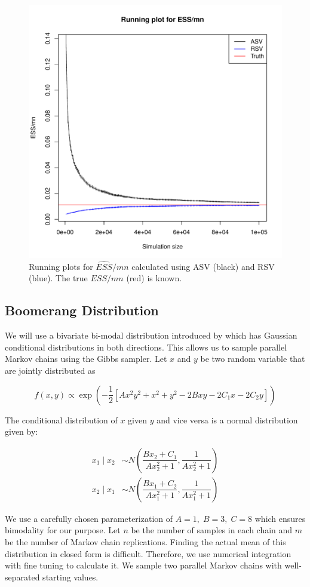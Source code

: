 \documentclass[12pt]{article}
\begin{document}
\begin{figure}[h]
    \centering
    \includegraphics[width = .5\textwidth]{plots/var-ess.pdf}
    \caption{Running plots for $\hat{ESS}/mn$ calculated using ASV (black) and RSV (blue). The true $ESS/mn$ (red) is known.}
    \label{fig:var-ess}
\end{figure}


\subsection{Boomerang Distribution} \label{ex:boomerang}

We will use a bivariate bi-modal distribution introduced by \cite{gelman1991note} which has Gaussian conditional distributions in both directions. This allows us to sample parallel Markov chains using the Gibbs sampler. Let $x$ and $y$ be two random variable that are jointly distributed as 

\[
f(x, y) \propto \exp\left(-\dfrac{1}{2}[Ax^2y^2 + x^2 + y^2 -2Bxy  -2C_1x - 2C_2y]\right)
\]

The conditional distribution of $x$ given $y$ and vice versa is a normal distribution given by:

\begin{align*}
    x_1 \mid x_2 &\sim N\left(\dfrac{Bx_2 + C_1}{Ax_2^2 + 1}, \dfrac{1}{Ax_2^2 + 1}\right)\\
    x_2 \mid x_1 &\sim N\left(\dfrac{Bx_1 + C_2}{Ax_1^2 + 1}, \dfrac{1}{Ax_1^2 + 1}\right)
\end{align*}

We use a carefully chosen parameterization of $A = 1,\; B = 3,\; C = 8$ which ensures bimodality for our purpose.  Let $n$ be the number of samples in each chain and $m$ be the number of Markov chain replications. Finding the actual mean of this distribution in closed form is difficult. Therefore, we use numerical integration with fine tuning to calculate it. We sample two parallel Markov chains with well-separated starting values. 
\end{document}
